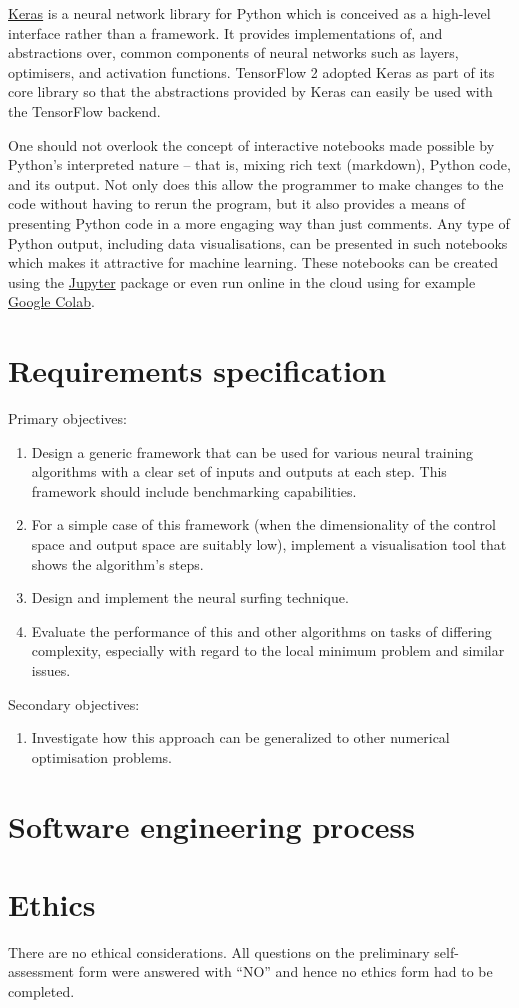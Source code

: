 \href{https://keras.io/}{Keras} is a neural network library for Python which is conceived as a high-level interface rather than a framework. 
It provides implementations of, and abstractions over, common components of neural networks such as layers, optimisers, and activation functions.
TensorFlow 2 adopted Keras as part of its core library so that the abstractions provided by Keras can easily be used with the TensorFlow backend.

One should not overlook the concept of interactive notebooks made possible by Python's interpreted nature -- that is, mixing rich text (markdown), Python code, and its output. 
Not only does this allow the programmer to make changes to the code without having to rerun the program, but it also provides a means of presenting Python code in a more engaging way than just comments.
Any type of Python output, including data visualisations, can be presented in such notebooks which makes it attractive for machine learning.
These notebooks can be created using the \href{https://jupyter.org/}{Jupyter} package or even run online in the cloud using for example \href{https://colab.research.google.com/}{Google Colab}. 

\section{Requirements specification}
\todo

Primary objectives:
\begin{enumerate}
    \item Design a generic framework that can be used for various neural training algorithms
    with a clear set of inputs and outputs at each step. This framework should include
    benchmarking capabilities.
    \item For a simple case of this framework (when the dimensionality of the control space
    and output space are suitably low), implement a visualisation tool that shows the
    algorithm’s steps.
    \item Design and implement the neural surfing technique.
    \item Evaluate the performance of this and other algorithms on tasks of differing
    complexity, especially with regard to the local minimum problem and similar issues.
\end{enumerate}
Secondary objectives:
\begin{enumerate}
    \item Investigate how this approach can be generalized to other numerical optimisation problems.
\end{enumerate}

\section{Software engineering process}
\todo

\section{Ethics}
There are no ethical considerations. 
All questions on the preliminary self-assessment form were answered with ``NO'' and hence no ethics form had to be completed.


